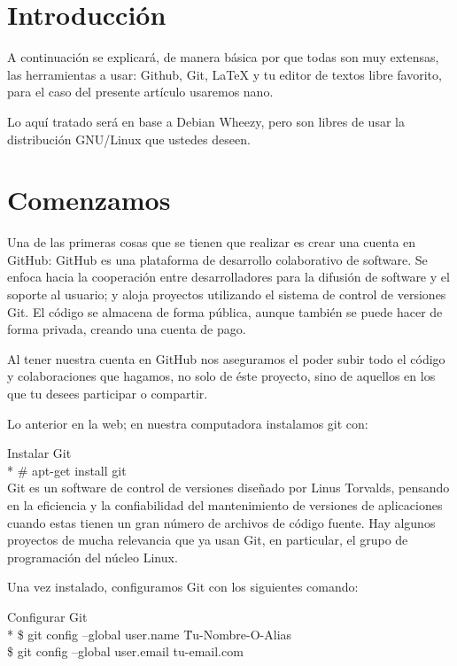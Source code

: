 \begin{multicols}{2}

\section*{Introducción}
A continuación se explicará, de manera básica por que todas son muy extensas, las herramientas a usar: Github, Git, LaTeX y tu editor de textos libre favorito, para el caso del presente artículo usaremos nano.\par
Lo aquí tratado será en base a Debian Wheezy, pero son libres de usar la distribución GNU/Linux que ustedes deseen.\par

\section*{Comenzamos}
Una de las primeras cosas que se tienen que realizar es crear una cuenta en GitHub: GitHub es una plataforma de desarrollo colaborativo de software. Se enfoca hacia la cooperación entre desarrolladores para la difusión de software y el soporte al usuario; y aloja proyectos utilizando el sistema de control de versiones Git. El código se almacena de forma pública, aunque también se puede hacer de forma privada, creando una cuenta de pago.\par
Al tener nuestra cuenta en GitHub nos aseguramos el poder subir todo el código y colaboraciones que hagamos, no solo de éste proyecto, sino de aquellos en los que tu desees participar o compartir.\par
Lo anterior en la web; en nuestra computadora instalamos git con:\par
\Code
   {Instalar Git}
   {
   \\*
   \# apt-get install git
   }
\\

Git es un software de control de versiones diseñado por Linus Torvalds, pensando en la eficiencia y la confiabilidad del mantenimiento de versiones de aplicaciones cuando estas tienen un gran número de archivos de código fuente. Hay algunos proyectos de mucha relevancia que ya usan Git, en particular, el grupo de programación del núcleo Linux.\par
Una vez instalado, configuramos Git con los siguientes comando:\par
\Code
   {Configurar Git}
   {
   \\*
	\$ git config –global user.name \"Tu-Nombre-O-Alias\"\\
	\$ git config –global user.email tu-email\@ejemplo.com\\
   }


\end{multicols}
